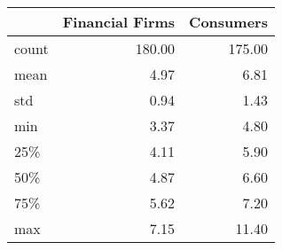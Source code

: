 \begin{tabular}{lrr}
\toprule
{} &  Financial Firms &  Consumers \\
\midrule
count &           180.00 &     175.00 \\
mean  &             4.97 &       6.81 \\
std   &             0.94 &       1.43 \\
min   &             3.37 &       4.80 \\
25\%   &             4.11 &       5.90 \\
50\%   &             4.87 &       6.60 \\
75\%   &             5.62 &       7.20 \\
max   &             7.15 &      11.40 \\
\bottomrule
\end{tabular}
